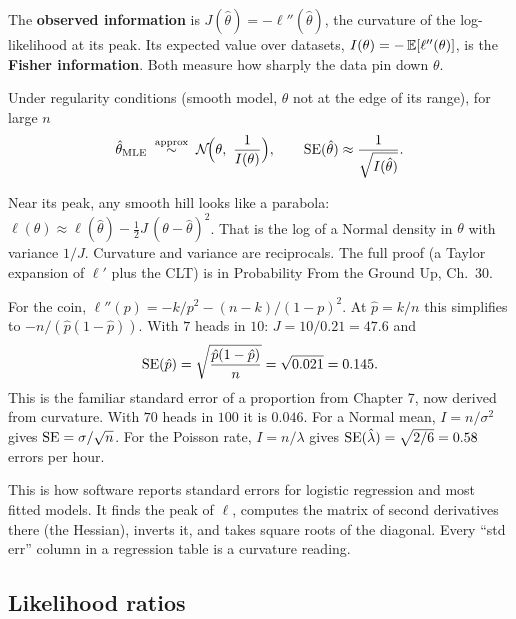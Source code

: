 \begin{definition}
The \textbf{observed information} is $J(\hat\theta) = -\ell''(\hat\theta)$, the
curvature of the log-likelihood at its peak. Its expected value over datasets,
$I(\theta) = -\operatorname{\mathbb{E}}[\ell''(\theta)]$, is the \textbf{Fisher information}. Both measure how
sharply the data pin down $\theta$.
\end{definition}

\begin{theorem}
Under regularity conditions (smooth model, $\theta$ not at the edge of its range), for
large $n$
\[
  \hat\theta_{\text{MLE}} \;\overset{\text{approx}}{\sim}\;
  \mathcal{N}\!\Big(\theta,\ \frac{1}{I(\theta)}\Big),
  \qquad
  \operatorname{SE}(\hat\theta) \approx \frac{1}{\sqrt{I(\hat\theta)}} .
\]
\end{theorem}

\begin{whybox}
Near its peak, any smooth hill looks like a parabola:
$\ell(\theta)\approx\ell(\hat\theta) - \tfrac12 J\,(\theta-\hat\theta)^2$. That is the
log of a Normal density in $\theta$ with variance $1/J$. Curvature and variance are
reciprocals. The full proof (a Taylor expansion of $\ell'$ plus the CLT) is in
Probability From the Ground Up, Ch.~30.
\end{whybox}

\begin{example}
For the coin, $\ell''(p) = -k/p^2 - (n-k)/(1-p)^2$. At $\hat p = k/n$ this simplifies to
$-n/(\hat p(1-\hat p))$. With $7$ heads in $10$: $J = 10/0.21 = 47.6$ and
\[
  \operatorname{SE}(\hat p) = \sqrt{\frac{\hat p(1-\hat p)}{n}} = \sqrt{0.021} = 0.145 .
\]
This is the familiar standard error of a proportion from Chapter 7, now derived from
curvature. With $70$ heads in $100$ it is $0.046$. For a Normal mean, $I = n/\sigma^2$
gives $\operatorname{SE} = \sigma/\sqrt n$. For the Poisson rate, $I = n/\lambda$ gives
$\operatorname{SE}(\hat\lambda) = \sqrt{2/6} = 0.58$ errors per hour.
\end{example}

\begin{happeningbox}
This is how software reports standard errors for logistic regression and most fitted
models. It finds the peak of $\ell$, computes the matrix of second derivatives there
(the Hessian), inverts it, and takes square roots of the diagonal. Every ``std err''
column in a regression table is a curvature reading.
\end{happeningbox}

\subsection{Likelihood ratios}


